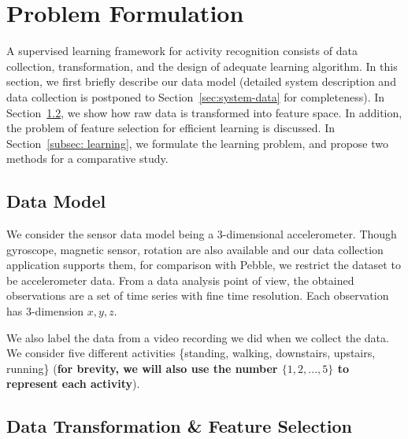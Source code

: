 \section{Problem Formulation}
\label{sec:problem-formulation}

A supervised learning framework for activity recognition consists of data collection, transformation, and the design of adequate learning algorithm. In this section, we first briefly describe our data model (detailed system description and data collection is postponed to Section~\ref{sec:system-data} for completeness). In Section~\ref{subsec: data-transform}, we show how raw data is transformed into feature space. In addition, the problem of feature selection for efficient learning is discussed. In Section~\ref{subsec: learning}, we formulate the learning problem, and propose two methods for a comparative study.  

\subsection{Data Model}
\label{subsec: data-model}
We consider the sensor data model being a 3-dimensional accelerometer. Though gyroscope, magnetic sensor, rotation are also available and our data collection application supports them, for comparison with Pebble, we restrict the dataset to be accelerometer data. From a data analysis point of view, the obtained observations are a set of time series with fine time resolution. Each observation has 3-dimension $x, y, z$. 

We also label the data from a video recording we did when we collect the data. We consider five different activities \{standing, walking, downstairs, upstairs, running\} ({\bf for brevity, we will also use the number $\{1,2,...,5\}$ to represent each activity}). 

\subsection{Data Transformation \& Feature Selection}
\label{subsec: data-transform}

